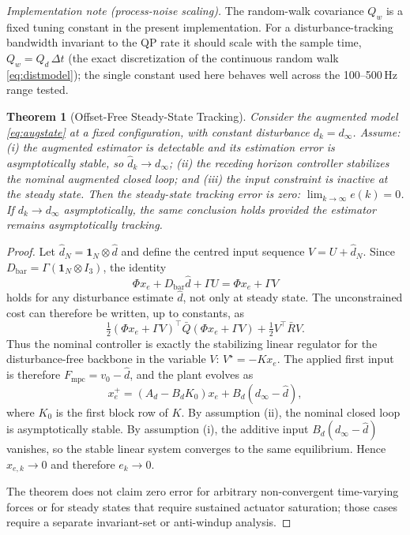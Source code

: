 \documentclass[journal]{IEEEtran}
\newtheorem{theorem}{Theorem}
\newcommand{\Fmpc}{F_{\text{mpc}}}
\begin{document}
\textit{Implementation note (process-noise scaling).}
The random-walk covariance $Q_w$ is a fixed tuning constant in the present
implementation. For a disturbance-tracking bandwidth invariant to the QP rate
it should scale with the sample time, $Q_w=Q_d\,\Delta t$ (the exact
discretization of the continuous random walk \eqref{eq:distmodel}); the single
constant used here behaves well across the 100--500\,Hz range tested.

\begin{theorem}[Offset-Free Steady-State Tracking]\label{thm:zss}
Consider the augmented model \eqref{eq:augstate} at a fixed
configuration, with constant disturbance $d_k=d_\infty$. Assume:
(i) the augmented estimator is detectable and its estimation error is
asymptotically stable, so $\hat d_{k}\to d_\infty$; (ii) the receding
horizon controller stabilizes the nominal augmented closed loop; and
(iii) the input constraint is inactive at the steady state. Then the
steady-state tracking error is zero:
$\lim_{k\to\infty}e(k)=0$. If $d_k\to d_\infty$ asymptotically, the
same conclusion holds provided the estimator remains asymptotically
tracking.
\end{theorem}
\begin{proof}
Let $\hat d_N=\mathbf 1_N\otimes\hat d$ and define the centred input sequence
$V=U+\hat d_N$. Since $D_{\text{bar}}=\Gamma(\mathbf 1_N\otimes I_3)$, the
identity
\[
  \Phi x_e+D_{\text{bar}}\hat d+\Gamma U=\Phi x_e+\Gamma V
\]
holds for any disturbance estimate $\hat d$, not only at steady state. The
unconstrained cost can therefore be written, up to constants, as
\begin{equation*}
 \tfrac12(\Phi x_e+\Gamma V)^\top\bar Q(\Phi x_e+\Gamma V)
 +\tfrac12 V^\top\bar R V .
\end{equation*}
Thus the nominal controller is exactly the stabilizing linear regulator for
the disturbance-free backbone in the variable $V$: $V^\star=-Kx_e$. The
applied first input is therefore $\Fmpc=v_0-\hat d$, and the plant evolves as
\begin{equation*}
  x_e^+=(A_d-B_dK_0)x_e+B_d(d_\infty-\hat d),
\end{equation*}
where $K_0$ is the first block row of $K$. By assumption (ii), the nominal
closed loop is asymptotically stable. By assumption (i), the additive input
$B_d(d_\infty-\hat d)$ vanishes, so the stable linear system converges to the
same equilibrium. Hence $x_{e,k}\to0$ and therefore $e_k\to0$.

The theorem does not claim zero error for arbitrary non-convergent
time-varying forces or for steady states that require sustained actuator
saturation; those cases require a separate invariant-set or anti-windup
analysis.
\end{proof}
\end{document}
